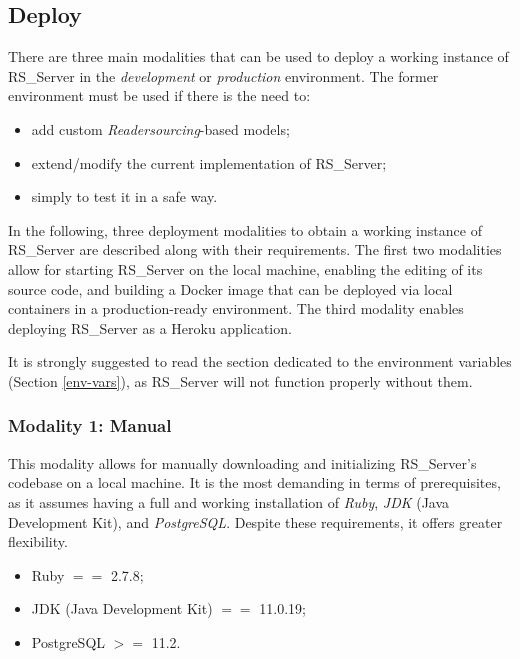 \documentclass[a4paper, english]{article}
\newcounter{subsubsubsection}[subsubsection]
\newcommand{\rsserver}{RS\_Server\xspace}
\begin{document}
\subsection{Deploy}

There are three main modalities that can be used to deploy a working instance of \rsserver in the \emph{development} or \emph{production} environment. The former environment must be used if there is the need to:
\begin{itemize}
\item add custom \emph{Readersourcing}-based models;
\item extend/modify the current implementation of \rsserver;
\item simply to test it in a safe way.
\end{itemize}

In the following, three deployment modalities to obtain a working instance of \rsserver are described along with their requirements. The first two modalities allow for starting \rsserver on the local machine, enabling the editing of its source code, and building a Docker image that can be deployed via local containers in a production-ready environment. The third modality enables deploying \rsserver as a Heroku application.

It is strongly suggested to read the section dedicated to the environment variables (Section \ref{env-vars}), as \rsserver will not function properly without them.

\subsubsection{Modality 1: Manual}

\label{deploy1}

This modality allows for manually downloading and initializing \rsserver's codebase on a local machine. It is the most demanding in terms of prerequisites, as it assumes having a full and working installation of \emph{Ruby}, \emph{JDK} (Java Development Kit), and \emph{PostgreSQL}. Despite these requirements, it offers greater flexibility.


\begin{itemize}
\item Ruby $==$ 2.7.8;
\item JDK (Java Development Kit) $==$ 11.0.19;
\item PostgreSQL $>=$ 11.2.
\end{itemize}
\end{document}

